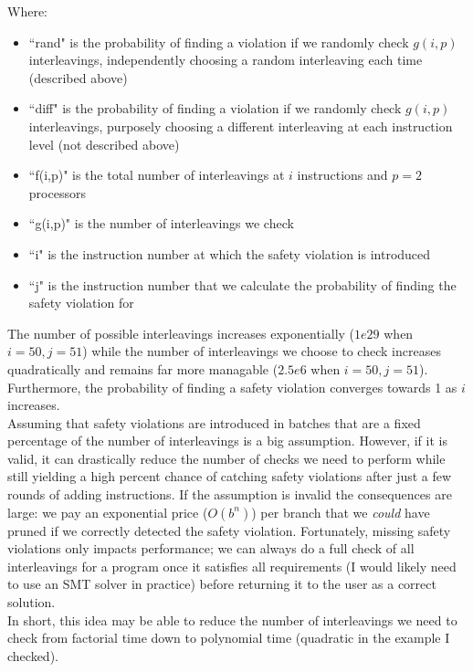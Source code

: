 \documentclass[12pt]{article}
\begin{document}
Where:
\begin{itemize}
	\item ``rand" is the probability of finding a violation if we randomly check $g(i,p)$ interleavings, independently choosing a random interleaving each time (described above)
	\item ``diff" is the probability of finding a violation if we randomly check $g(i,p)$ interleavings, purposely choosing a different interleaving at each instruction level (not described above)
	\item ``f(i,p)" is the total number of interleavings at $i$ instructions and $p=2$ processors
	\item ``g(i,p)" is the number of interleavings we check
	\item ``i" is the instruction number at which the safety violation is introduced
	\item ``j" is the instruction number that we calculate the probability of finding the safety violation for
\end{itemize}

The number of possible interleavings increases exponentially ($1e29$ when $i=50,j=51$) while the number of interleavings we choose to check increases quadratically and remains far more managable ($2.5e6$ when $i=50,j=51$).  Furthermore, the probability of finding a safety violation converges towards 1 as $i$ increases.  \\

Assuming that safety violations are introduced in batches that are a fixed percentage of the number of interleavings is a big assumption.  However, if it is valid, it can drastically reduce the number of checks we need to perform while still yielding a high percent chance of catching safety violations after just a few rounds of adding instructions.  If the assumption is invalid the consequences are large: we pay an exponential price ($O(b^n)$) per branch that we \textit{could} have pruned if we correctly detected the safety violation.  Fortunately, missing safety violations only impacts performance; we can always do a full check of all interleavings for a program once it satisfies all requirements (I would likely need to use an SMT solver in practice) before returning it to the user as a correct solution.  \\

In short, this idea may be able to reduce the number of interleavings we need to check from factorial time down to polynomial time (quadratic in the example I checked).  
\end{document}
